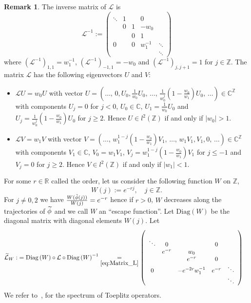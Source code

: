 \documentclass[10pt]{amsart}
\theoremstyle{definition}\newtheorem{defi}[theo]{Definition}\newtheorem{rema}[theo]{Remark}\newtheorem{exam}[theo]{Example}\newtheorem{exem}[theo]{Example}\newtheorem{nota}[theo]{Notation}
\newcommand{\clL}{\mathcal{L}}
\newcommand{\Diag}{\mathrm{Diag}}
\newcommand{\bbR}{\mathbb{R}}
\newcommand{\bbC}{\mathbb{C}}
\newcommand{\bbZ}{\mathbb{Z}}
\let\oldtilde\tilde
\renewcommand*{\tilde}[1]{\mathchoice{\widetilde{#1}}{\widetilde{#1}}{\oldtilde{#1}}{\oldtilde{#1}}}
\begin{document}
\begin{rema}\label{rem:The-inverse-of}
The inverse matrix of $\clL$ is
\begin{equation}\label{eq:Matrix_L-1}
\clL^{-1}:=\left(
\begin{array}{ccccc}
\\
\ddots & 1 & & 0\\
& 0 & 1 & -w_{0}\\
& & 0 & 1\\
0 & & 0 & w_{1}^{-1} & \ddots\\
& & & & \ddots
\end{array}\right)
\end{equation}
where $(\clL^{-1})_{1,1}=w_{1}^{-1}$, $(\clL^{-1})_{-1,1}=-w_{0}$ and $(\clL^{-1})_{j,j+1}=1$ for $j\in\bbZ$. The matrix $\clL$ has the following eigenvectors $U$ and $V$:
\begin{itemize}
\item $\clL U=w_{0}U$ with vector $U=(\ldots,\,0,U_{0},\frac{1}{w_{0}}U_{0},\,\ldots,\,\frac{1}{w_{0}^{j}}(1-\frac{w_{0}}{w_{1}})U_{0},\,\ldots)\in\bbC^{\bbZ}$ with components $U_{j}=0$ for $j<0$, $U_{0}\in\bbC$, $U_{1}=\frac{1}{w_{0}}U_{0}$ and $U_{j}=\frac{1}{w_{0}^{j}}(1-\frac{w_{0}}{w_{1}})U_{0}$ for $j\geq2$. Hence $U\in l^{2}(\bbZ)$ if and only if $|w_{0}|>1$.
\item $\clL V=w_{1}V$ with vector $V=(\ldots,\,w_{1}^{1-j}(1-\frac{w_{0}}{w_{1}})V_{1},\,\ldots,\,w_{1}V_{1},V_{1},0,\,\ldots)\in\bbC^{\bbZ}$ with components $V_{1}\in\bbC$, $V_{0}=w_{1}V_{1}$, $V_{j}=w_{1}^{1-j}(1-\frac{w_{0}}{w_{1}})V_{1}$ for $j\leq-1$ and $V_{j}=0$ for $j\geq2$. Hence $V\in l^{2}(\bbZ)$ if and only if $|w_{1}|<1$.
\end{itemize}
\end{rema}

For some $r\in\bbR$ called the order, let us consider the following function $W$ on $\bbZ$,
\[
W\left(j\right):=e^{-rj},\quad j\in\bbZ.
\]
For $j\neq0,2$ we have $\frac{W(\tilde{\phi}(j))}{W(j)}=e^{-r}$ hence if $r>0$, $W$ decreases along the trajectories of $\tilde{\phi}$ and we call $W$ an ``escape function''. Let $\Diag(W)$ be the diagonal matrix with diagonal elements $W(j)$. Let
\begin{align}\label{eq:def_L_tilde_W}
\tilde{\clL}_{W}: & =\Diag\left(W\right)\circ\clL\circ\Diag\left(W\right)^{-1}\underset{\eqref{eq:Matrix_L}}{=}\left(
\begin{array}{ccccc}
\\
\ddots & 0 & & 0\\
& e^{-r} & w_{0}\\
& & e^{-r} & 0\\
0 & & -e^{-2r}w_{1}^{-1} & e^{-r} & \ddots\\
& & & & \ddots
\end{array}\right)
\end{align}
We refer to~\cite[Chap.~1]{bottcher2012introduction}, \cite[p.~51]{trefethen_book_05} for the spectrum of Toeplitz operators.
\end{document}
